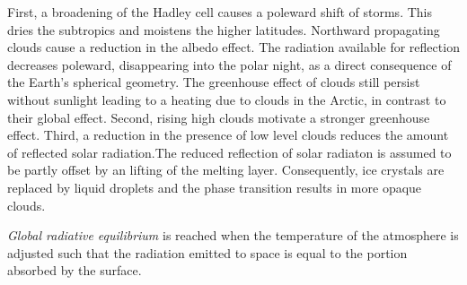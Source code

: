 First, a broadening of the Hadley cell causes a poleward shift of storms. This dries the subtropics and moistens the higher latitudes. Northward propagating clouds cause a reduction in the albedo effect. The radiation available for reflection decreases poleward, disappearing into the polar night, as a direct consequence of the Earth's spherical geometry.
The greenhouse effect of clouds still persist without sunlight leading to a heating due to clouds in the Arctic, in contrast to their global effect.
Second, rising high clouds motivate a stronger greenhouse effect. Third, a reduction in the presence of low level clouds reduces the amount of reflected solar radiation.The reduced reflection of solar radiaton is assumed to be partly offset by an lifting of the melting layer. Consequently, ice crystals are replaced by liquid droplets and the phase transition results in more opaque clouds. 



\textit{Global radiative equilibrium} is reached when the temperature of the atmosphere is adjusted such that the radiation emitted to space is equal to the portion absorbed by the surface.
